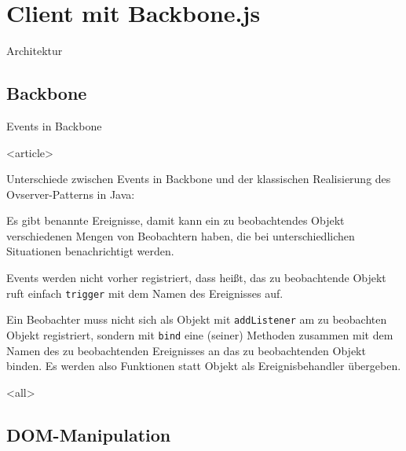 \section[Client]{Client mit Backbone.js}

\begin{frame}{Architektur}
  \begin{center}
    
  \end{center}
\end{frame}

\subsection{Backbone}

\begin{Frame}[fragile]{Events in Backbone}
  \begin{center}
    
  \end{center}
\end{Frame}

\mode
<article>

Unterschiede zwischen Events in Backbone und der klassischen Realisierung
des Ovserver-Patterns in Java:
\begin{compactitem}
  \item Es gibt benannte Ereignisse, damit kann ein zu beobachtendes Objekt
    verschiedenen Mengen von Beobachtern haben, die bei unterschiedlichen
    Situationen benachrichtigt werden.
  \item Events werden nicht vorher registriert, dass heißt, das zu beobachtende
    Objekt ruft einfach \lstinline-trigger- mit dem Namen des Ereignisses auf.
  \item Ein Beobachter muss nicht sich als Objekt mit \lstinline-addListener-
    am zu beobachten Objekt registriert, sondern mit \lstinline-bind-
    eine (seiner) Methoden zusammen mit dem Namen des zu beobachtenden
    Ereignisses an das zu beobachtenden Objekt binden. Es werden also
    Funktionen statt Objekt als Ereignisbehandler übergeben.
\end{compactitem}

\mode
<all>

\subsection{DOM-Manipulation}

